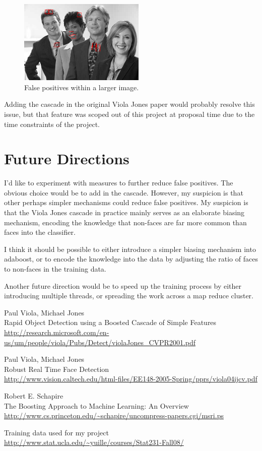 \documentclass[11pt,twocolumn]{article}
\begin{document}
\begin{figure}
\includegraphics[width=60mm]{examples/search_out.png}
\caption{False positives within a larger image.}
\label{fig:searchfalsepositives}
\end{figure}

Adding the cascade in the original Viola Jones paper would probably
resolve this issue, but that feature was scoped out of this project at
proposal time due to the time constraints of the project.

\section{Future Directions}

I'd like to experiment with measures to further reduce false
positives. The obvious choice would be to add in the cascade. However,
my suspicion is that other perhaps simpler mechanisms could reduce
false positives. My suspicion is that the Viola Jones cascade in
practice mainly serves as an elaborate biasing mechanism, encoding the
knowledge that non-faces are far more common than faces into the
classifier.

I think it should be possible to either introduce a simpler biasing
mechanism into adaboost, or to encode the knowledge into the data by
adjusting the ratio of faces to non-faces in the training data.

Another future direction would be to speed up the training process by
either introducing multiple threads, or spreading the work across a
map reduce cluster.

\begin{thebibliography}{9}

  Paul Viola, Michael Jones\\
  Rapid Object Detection using a Boosted Cascade of Simple Features\\
  \url{http://research.microsoft.com/en-us/um/people/viola/Pubs/Detect/violaJones_CVPR2001.pdf}

  Paul Viola, Michael Jones\\
  Robust Real Time Face Detection\\
  \url{http://www.vision.caltech.edu/html-files/EE148-2005-Spring/pprs/viola04ijcv.pdf}

  Robert E. Schapire\\
  The Boosting Approach to Machine Learning: An Overview\\
  \url{http://www.cs.princeton.edu/~schapire/uncompress-papers.cgi/msri.ps}

  Training data used for my project\\
  \url{http://www.stat.ucla.edu/~yuille/courses/Stat231-Fall08/}

\end{thebibliography}
\end{document}
